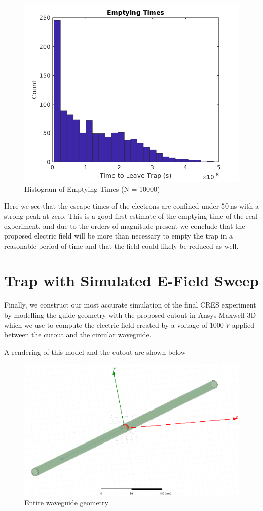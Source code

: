 \documentclass[12pt,letterpaper]{article}
\begin{document}
    \begin{figure}[H]
    \centering
    \includegraphics[width=0.7\linewidth]{img/emptying.png}
    \caption{Histogram of Emptying Times (N = 10000)}
    \end{figure}

Here we see that the escape times of the electrons are confined under $50~$ns with a strong peak at zero. This is a good first estimate of the emptying time of the real experiment, and due to the orders of magnitude present we conclude that the proposed electric field will be more than necessary to empty the trap in a reasonable period of time and that the field could likely be reduced as well.

\section{Trap with Simulated E-Field Sweep}
Finally, we construct our most accurate simulation of the final CRES experiment by modelling the guide geometry with the proposed cutout in Ansys Maxwell 3D which we use to compute the electric field created by a voltage of $1000~V$ applied between the cutout and the circular waveguide. 

A rendering of this model and the cutout are shown below

    \begin{figure}[H]
    \centering
    \includegraphics[width=0.9\linewidth]{img/waveguide.png}
    \caption{Entire waveguide geometry}
    \end{figure}
    
\end{document}
